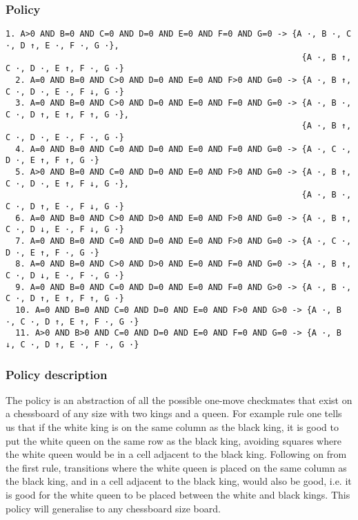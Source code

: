 \documentclass[a4paper]{article}
\begin{document}
\subsubsection{Policy}
\begin{Verbatim}[fontsize=\footnotesize]
  1. A>0 AND B=0 AND C=0 AND D=0 AND E=0 AND F=0 AND G=0 -> {A ·, B ·, C ·, D ↑, E ·, F ·, G ·},
                                                            {A ·, B ↑, C ·, D ·, E ↑, F ·, G ·}
  2. A=0 AND B=0 AND C>0 AND D=0 AND E=0 AND F>0 AND G=0 -> {A ·, B ↑, C ·, D ·, E ·, F ↓, G ·}
  3. A=0 AND B=0 AND C>0 AND D=0 AND E=0 AND F=0 AND G=0 -> {A ·, B ·, C ·, D ↑, E ↑, F ↑, G ·},
                                                            {A ·, B ↑, C ·, D ·, E ·, F ·, G ·}
  4. A=0 AND B=0 AND C=0 AND D=0 AND E=0 AND F=0 AND G=0 -> {A ·, C ·, D ·, E ↑, F ↑, G ·}
  5. A>0 AND B=0 AND C=0 AND D=0 AND E=0 AND F>0 AND G=0 -> {A ·, B ↑, C ·, D ·, E ↑, F ↓, G ·},
                                                            {A ·, B ·, C ·, D ↑, E ·, F ↓, G ·}
  6. A=0 AND B=0 AND C>0 AND D>0 AND E=0 AND F>0 AND G=0 -> {A ·, B ↑, C ·, D ↓, E ·, F ↓, G ·}
  7. A=0 AND B=0 AND C=0 AND D=0 AND E=0 AND F>0 AND G=0 -> {A ·, C ·, D ·, E ↑, F ·, G ·}
  8. A=0 AND B=0 AND C>0 AND D>0 AND E=0 AND F=0 AND G=0 -> {A ·, B ↑, C ·, D ↓, E ·, F ·, G ·}
  9. A=0 AND B=0 AND C=0 AND D=0 AND E=0 AND F=0 AND G>0 -> {A ·, B ·, C ·, D ↑, E ↑, F ↑, G ·}
  10. A=0 AND B=0 AND C=0 AND D=0 AND E=0 AND F>0 AND G>0 -> {A ·, B ·, C ·, D ↑, E ↑, F ·, G ·}
  11. A>0 AND B>0 AND C=0 AND D=0 AND E=0 AND F=0 AND G=0 -> {A ·, B ↓, C ·, D ↑, E ·, F ·, G ·}
\end{Verbatim}

\subsubsection{Policy description}
The policy is an abstraction of all the possible one-move checkmates that exist on a chessboard of any size with two kings and a queen. For example rule one tells us that if the white king is on the same column as the black king, it is good to put the white queen on the same row as the black king, avoiding squares where the white queen would be in a cell adjacent to the black king. Following on from the first rule, transitions where the white queen is placed on the same column as the black king, and in a cell adjacent to the black king, would also be good, i.e. it is good for the white queen to be placed between the white and black kings. This policy will generalise to any chessboard size board.
\end{document}
